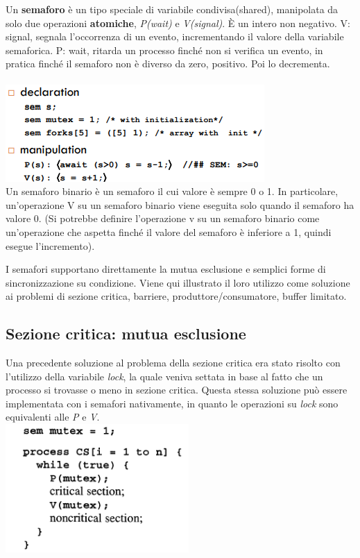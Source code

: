 \documentclass[10pt,a4paper]{article}
\begin{document}
Un \textbf{semaforo} è un tipo speciale di variabile condivisa(shared), manipolata da solo due operazioni \textbf{atomiche}, \textit{P(wait)} e \textit{V(signal)}.
\`{E} un intero non negativo.
V: signal, segnala l'occorrenza di un evento, incrementando il valore della variabile semaforica.
P: wait, ritarda un processo finché non si verifica un evento, in pratica finché il semaforo non è diverso da zero, positivo. Poi lo decrementa.\\ \\
\includegraphics[scale=0.7]{img/sem.png} \\

Un semaforo binario è un semaforo il cui valore è sempre 0 o 1. In particolare, un'operazione V su un semaforo binario viene eseguita solo quando il semaforo ha valore 0. (Si potrebbe definire l'operazione v su un semaforo binario come un'operazione che aspetta finché il valore del semaforo è inferiore a 1, quindi esegue l'incremento).

I semafori supportano direttamente la mutua esclusione e semplici forme di sincronizzazione su condizione.
Viene qui illustrato il loro utilizzo come soluzione ai problemi di sezione critica, barriere, produttore/consumatore, buffer limitato.

\subsection{Sezione critica: mutua esclusione}
Una precedente soluzione al problema della sezione critica era stato risolto con l'utilizzo della variabile \textit{lock}, la quale veniva settata in base al fatto che un processo si trovasse o meno in sezione critica.
Questa stessa soluzione può essere implementata con i semafori nativamente, in quanto le operazioni su \textit{lock} sono equivalenti alle \textit{P} e \textit{V}.\\
\includegraphics[scale=0.7]{img/sem1.png} \\
\end{document}
